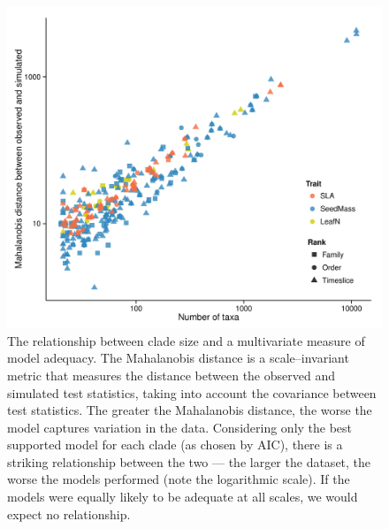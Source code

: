 \documentclass[a4paper,11pt]{article}
\begin{document}
{\begin{figure}[p]
  \centering
  \includegraphics[scale=0.8]{figs/ad-size-ml}
  \caption{The relationship between clade size and a multivariate measure of model adequacy. The Mahalanobis distance is a scale--invariant metric that measures the distance between the observed and simulated test statistics, taking into account the covariance between test statistics. The greater the Mahalanobis distance, the worse the model captures variation in the data. Considering only the best supported model for each clade (as chosen by AIC), there is a striking relationship between the two --- the larger the dataset, the worse the models performed (note the logarithmic scale). If the models were equally likely to be adequate at all scales, we would expect no relationship.}
  \label{fig:size-adequacy}
\end{figure}


\renewcommand\thefigure{S\arabic{figure}}
\renewcommand\thetable{S \arabic{table}}
\setcounter{figure}{0}    
\setcounter{table}{0}


}
\end{document}
